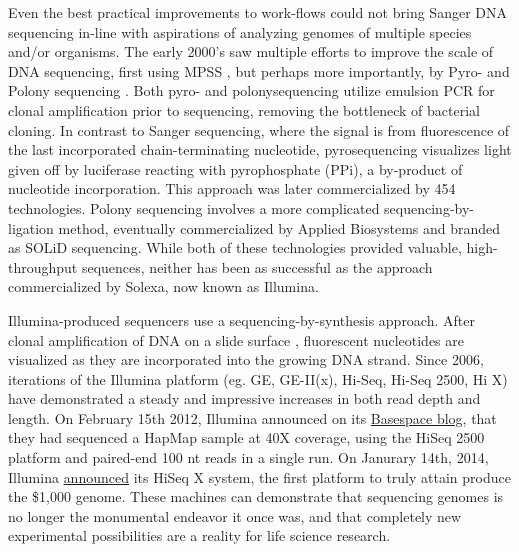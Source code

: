     Even the best practical improvements to work-flows could not bring Sanger DNA sequencing in-line with aspirations of analyzing genomes of multiple species and/or organisms. The early 2000’s saw multiple efforts to improve the scale of DNA sequencing, first using MPSS \citep{Brenner2000a}, but perhaps more importantly, by Pyro- \citep{Ronaghi1998a} and Polony sequencing \citep{Shendure2005}. Both pyro- and polonysequencing utilize emulsion PCR \citep{Nakano2003a} for clonal amplification prior to sequencing, removing the bottleneck of bacterial cloning. In contrast to Sanger sequencing, where the signal is from fluorescence of the last incorporated chain-terminating nucleotide, pyrosequencing visualizes light given off by luciferase reacting with pyrophosphate (PPi), a by-product of nucleotide incorporation. This approach was later commercialized by 454 technologies. Polony sequencing involves a more complicated sequencing-by-ligation method, eventually commercialized by Applied Biosystems and branded as SOLiD sequencing. While both of these technologies provided valuable, high-throughput sequences, neither has been as successful as the approach commercialized by Solexa, now known as Illumina.

    Illumina-produced sequencers use a sequencing-by-synthesis approach. After clonal amplification of DNA on a slide surface \citep{Bentley2008}, fluorescent nucleotides are visualized as they are incorporated into the growing DNA strand. Since 2006, iterations of the Illumina platform (eg. GE, GE-II(x), Hi-Seq, Hi-Seq 2500, Hi X) have demonstrated a steady and impressive increases in both read depth and length. On February 15th 2012, Illumina announced on its \href{http://blog.basespace.illumina.com/}{Basespace blog}, that they had sequenced a HapMap sample at 40X coverage, using the HiSeq 2500 platform and paired-end 100 nt reads in a single run. On Janurary 14th, 2014, Illumina \href{http://bit.ly/PZpegZ}{announced} its HiSeq X system, the first platform to truly attain produce the \$1,000 genome. These machines can demonstrate that sequencing genomes is no longer the monumental endeavor it once was, and that completely new experimental possibilities are a reality for life science research.

